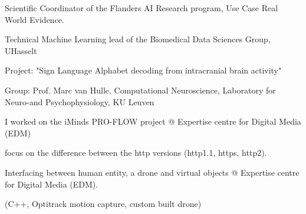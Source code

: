 
\begin{cventries}
{\begin{cvitems}\item Scientific Coordinator of the Flanders AI Research program, Use Case Real World Evidence.\item Technical Machine Learning lead of the Biomedical Data Sciences Group, UHasselt\end{cvitems}
}

{\begin{cvitems}\item Project: "Sign Language Alphabet decoding from intracranial brain activity"\item Group: Prof. Marc van Hulle, Computational Neuroscience, Laboratory for Neuro-and Psychophysiology, KU Leuven\end{cvitems}
}

{\begin{cvitems}\item I worked on the iMinds PRO-FLOW project @ Expertise centre for Digital Media (EDM)\item focus on the difference between the http versions (http1.1, https, http2).\end{cvitems}
}

{\begin{cvitems}\item Interfacing between human entity, a drone and virtual objects @ Expertise centre for Digital Media (EDM). \item (C++, Optitrack motion capture, custom built drone)\end{cvitems}
}


\end{cventries}
